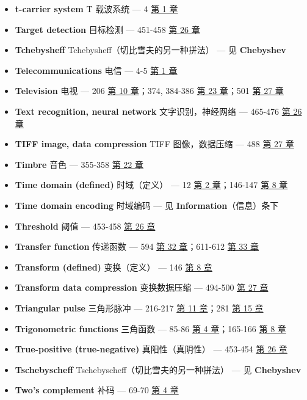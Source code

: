 \begin{itemize}
\tightlist
\item
  \textbf{t-carrier system} T 载波系统 --- 4 
  \hyperref[ch-01]{第 1 章}
\item
  \textbf{Target detection} 目标检测 --- 451-458 
  \hyperref[ch-26]{第 26 章}
\item
  \textbf{Tchebysheff} Tchebysheff（切比雪夫的另一种拼法） --- 见
  \textbf{Chebyshev}
\item
  \textbf{Telecommunications} 电信 --- 4-5 
  \hyperref[ch-01]{第 1 章}
\item
  \textbf{Television} 电视 --- 206  \hyperref[ch-10]{第 10
  章}；374, 384-386  \hyperref[ch-23]{第 23 章}；501
   \hyperref[ch-27]{第 27 章}
\item
  \textbf{Text recognition, neural network} 文字识别，神经网络 ---
  465-476  \hyperref[ch-26]{第 26 章}
\item
  \textbf{TIFF image, data compression} TIFF 图像，数据压缩 --- 488
   \hyperref[ch-27]{第 27 章}
\item
  \textbf{Timbre} 音色 --- 355-358  \hyperref[ch-22]{第 22 章}
\item
  \textbf{Time domain (defined)} 时域（定义） --- 12 
  \hyperref[ch-02]{第 2 章}；146-147  \hyperref[ch-08]{第 8
  章}
\item
  \textbf{Time domain encoding} 时域编码 --- 见
  \textbf{Information}（信息）条下
\item
  \textbf{Threshold} 阈值 --- 453-458  \hyperref[ch-26]{第 26
  章}
\item
  \textbf{Transfer function} 传递函数 --- 594 
  \hyperref[ch-32]{第 32 章}；611-612  \hyperref[ch-33]{第 33
  章}
\item
  \textbf{Transform (defined)} 变换（定义） --- 146 
  \hyperref[ch-08]{第 8 章}
\item
  \textbf{Transform data compression} 变换数据压缩 --- 494-500
   \hyperref[ch-27]{第 27 章}
\item
  \textbf{Triangular pulse} 三角形脉冲 --- 216-217 
  \hyperref[ch-11]{第 11 章}；281  \hyperref[ch-15]{第 15 章}
\item
  \textbf{Trigonometric functions} 三角函数 --- 85-86 
  \hyperref[ch-04]{第 4 章}；165-166  \hyperref[ch-08]{第 8
  章}
\item
  \textbf{True-positive (true-negative)} 真阳性（真阴性） --- 453-454
   \hyperref[ch-26]{第 26 章}
\item
  \textbf{Tschebyscheff} Tschebyscheff（切比雪夫的另一种拼法） --- 见
  \textbf{Chebyshev}
\item
  \textbf{Two's complement} 补码 --- 69-70 
  \hyperref[ch-04]{第 4 章}
\end{itemize}

